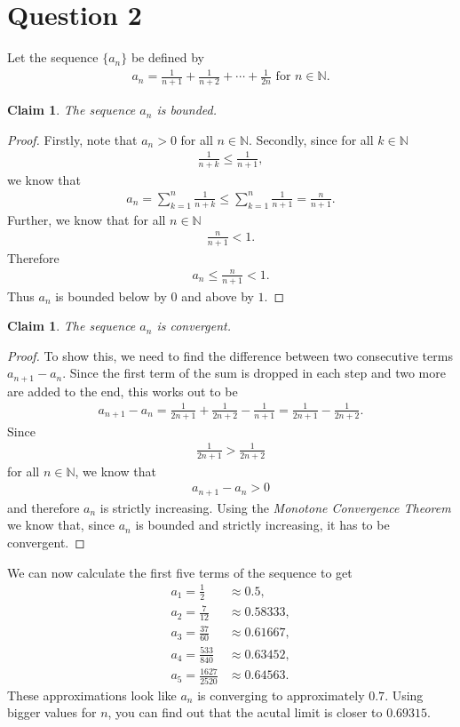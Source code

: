 \documentclass{article}
\newcommand{\N}{\mathbb{N}}
\newtheorem{claim}[section]{Claim}
\begin{document}
\section*{Question 2}
Let the sequence $\{a_n\}$ be defined by
\begin{align*}
  a_n = \frac{1}{n+1}+\frac{1}{n+2}+\cdots+\frac{1}{2n} \text{ for } n\in\N.
\end{align*}
\begin{claim}
  The sequence $a_n$ is bounded.
\end{claim}
\begin{proof}
  Firstly, note that $a_n>0$ for all $n\in\N$.
  Secondly, since for all $k\in\N$
  \begin{align*}
    \frac{1}{n+k}\leq \frac{1}{n+1},
  \end{align*}
  we know that
  \begin{align*}
    a_n = \sum_{k=1}^n \frac{1}{n+k} \leq \sum_{k=1}^n \frac{1}{n+1}=\frac{n}{n+1}.
  \end{align*}
  Further, we know that for all $n\in\N$
  \begin{align*}
    \frac{n}{n+1} < 1.
  \end{align*}
  Therefore
  \begin{align*}
    a_n \leq \frac{n}{n+1} < 1.
  \end{align*}
  Thus $a_n$ is bounded below by $0$ and above by $1$.
\end{proof}
\begin{claim}
  The sequence $a_n$ is convergent.
\end{claim}
\begin{proof}
  To show this, we need to find the difference between two consecutive terms $a_{n+1}-a_n$.
  Since the first term of the sum is dropped in each step and two more are added to the end, this works out to be
  \begin{align*}
    a_{n+1}-a_n = \frac{1}{2n+1}+\frac{1}{2n+2}-\frac{1}{n+1}=\frac{1}{2n+1}-\frac{1}{2n+2}.
  \end{align*}
  Since 
  \begin{align*}
    \frac{1}{2n+1}>\frac{1}{2n+2}
  \end{align*}
  for all $n\in\N$, we know that
  \begin{align*}
    a_{n+1}-a_n > 0
  \end{align*}
  and therefore $a_n$ is strictly increasing. 
  Using the \emph{Monotone Convergence Theorem} we know that, since $a_n$ is bounded and strictly increasing, it has to be convergent.
\end{proof}
\noindent We can now calculate the first five terms of the sequence to get
\begin{align*}
  a_1 = \frac{1}{2}&\approx 0.5,\\
  a_2 = \frac{7}{12}&\approx 0.58333,\\
  a_3 = \frac{37}{60}&\approx 0.61667,\\
  a_4 = \frac{533}{840}&\approx 0.63452,\\
  a_5 = \frac{1627}{2520}&\approx 0.64563.
\end{align*}
These approximations look like $a_n$ is converging to approximately $0.7$.
Using bigger values for $n$, you can find out that the acutal limit is closer to $0.69315$.
\end{document}
